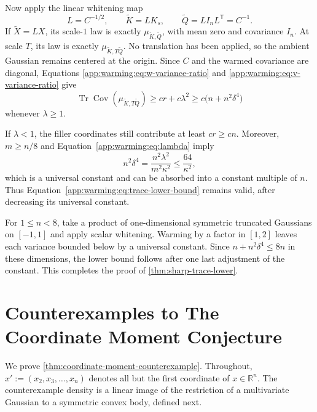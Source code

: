 \documentclass[11pt]{article}
\numberwithin{equation}{section}
\theoremstyle{definition}
\newcommand{\R}{\mathbb{R}}
\begin{document}
Now apply the linear whitening map
\begin{equation}
L=C^{-1/2},
\qquad
\widetilde K=LK_s,
\qquad
\widetilde Q
=LI_nL^{\mathsf T}
=C^{-1}.
\label{app:warming:eq:whitening}
\end{equation}
If $\widetilde X=LX$, its
scale-$1$ law is exactly
$\mu_{\widetilde K,\widetilde Q}$, with mean zero and covariance
$I_n$.
At scale $T$, its law is exactly
$\mu_{\widetilde K,T\widetilde Q}$.
No translation has been applied, so the ambient Gaussian remains centered at the
origin.
Since $C$ and the warmed covariance are diagonal, Equations
\eqref{app:warming:eq:w-variance-ratio} and
\eqref{app:warming:eq:v-variance-ratio} give
\begin{equation}
\operatorname{Tr}\operatorname{Cov} (\mu_{\widetilde K,T\widetilde Q})
\geq cr+c\lambda^2
\geq c\bigl(n+n^2\delta^4\bigr)
\label{app:warming:eq:trace-lower-bound}
\end{equation}
whenever $\lambda\geq1$.

If $\lambda<1$, the filler coordinates still contribute at least
$cr\geq cn$.
Moreover, $m\geq n/8$ and Equation~\eqref{app:warming:eq:lambda} imply
\[
n^2\delta^4
=\frac{n^2\lambda^2}{m^2\kappa^2}
\leq\frac{64}{\kappa^2},
\]
which is a universal constant and can be absorbed into a constant multiple of
$n$.
Thus Equation~\eqref{app:warming:eq:trace-lower-bound} remains valid, after
decreasing its universal constant.

For $1\leq n<8$, take a product of one-dimensional symmetric truncated Gaussians
on
$[-1,1]$ and apply scalar whitening.
Warming by a factor in $[1,2]$ leaves each variance bounded below by a universal
constant.
Since $n+n^2\delta^4\leq8n$ in these dimensions, the lower bound follows after
one last adjustment of the constant.
This completes the proof of \cref{thm:sharp-trace-lower}.
\section{Counterexamples to The Coordinate Moment Conjecture}
\label{sec:counter_coordinate_moment}

We prove \cref{thm:coordinate-moment-counterexample}.
Throughout, $x':=(x_2,x_3,\ldots,x_n)$ denotes all but the first coordinate of
$x\in\R^n$.
The counterexample density is a linear image of the restriction of a
multivariate Gaussian to a symmetric convex body, defined next.
\end{document}
